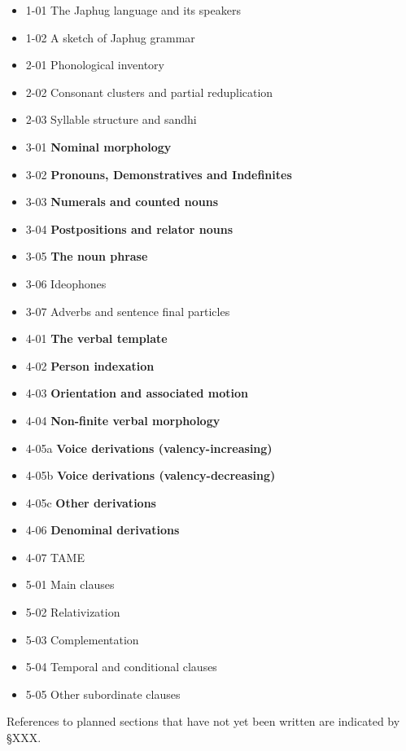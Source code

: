 \begin{itemize}
\item 1-01 The Japhug language and its speakers
\item 1-02 A sketch of Japhug grammar
\item 2-01 Phonological inventory 
\item 2-02 Consonant clusters and partial reduplication
\item 2-03 Syllable structure and sandhi
\item 3-01 \textbf{Nominal morphology}
\item 3-02 \textbf{Pronouns, Demonstratives and Indefinites}
\item 3-03 \textbf{Numerals and counted nouns}
\item 3-04 \textbf{Postpositions and relator nouns}
\item 3-05 \textbf{The noun phrase}
\item 3-06 Ideophones
\item 3-07 Adverbs and sentence final particles
\item 4-01 \textbf{The verbal template}
\item 4-02 \textbf{Person indexation}
\item 4-03 \textbf{Orientation and associated motion}
\item 4-04 \textbf{Non-finite verbal morphology}
\item 4-05a \textbf{Voice derivations (valency-increasing)}
\item 4-05b \textbf{Voice derivations (valency-decreasing)}
\item 4-05c \textbf{Other derivations} 
\item 4-06 \textbf{Denominal derivations}
\item 4-07 TAME
\item 5-01 Main clauses
\item 5-02 Relativization
\item 5-03 Complementation
\item 5-04 Temporal and conditional clauses
\item 5-05 Other subordinate clauses
\end{itemize}

 References to planned sections that have not yet been written are indicated by §XXX.
